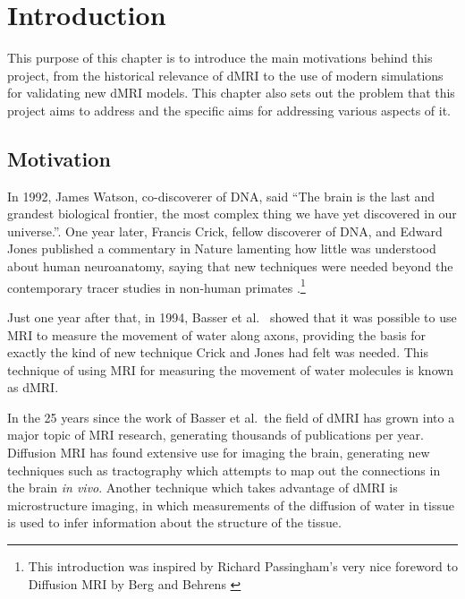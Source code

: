 \chapter{Introduction}
\label{sec:introduction}

\chaptertoc{}

\begin{chapterabstract}
  This purpose of this chapter is to introduce the main motivations behind this project, from the historical relevance of \acl{dMRI} to the use of modern simulations for validating new \acl{dMRI} models.
  This chapter also sets out the problem that this project aims to address and the specific aims for addressing various aspects of it.
\end{chapterabstract}

\section{Motivation}
\label{sec:intro_motivation}
In 1992, James Watson, co-discoverer of DNA, said ``The brain is the last and grandest biological frontier, the most complex thing we have yet discovered in our universe.''\cite{NAP1785}.
One year later, Francis Crick, fellow discoverer of DNA, and Edward Jones published a commentary in Nature lamenting how little was understood about human neuroanatomy, saying that new techniques were needed beyond the contemporary tracer studies in non-human primates \cite{Crick1993}.\footnote{This introduction was inspired by Richard Passingham's very nice foreword to Diffusion MRI by Berg and Behrens \cite{Johansen-Berg2013}}

Just one year after that, in 1994, Basser et al.\ \cite{Basser1994} showed that it was possible to use \ac{MRI} to measure the movement of water along axons, providing the basis for exactly the kind of new technique Crick and Jones had felt was needed.
This technique of using \ac{MRI} for measuring the movement of water molecules is known as \ac{dMRI}.

In the 25 years since the work of Basser et al.\ the field of \acl{dMRI} has grown into a major topic of \ac{MRI} research, generating thousands of publications per year.
Diffusion MRI has found extensive use for imaging the brain, generating new techniques such as tractography which attempts to map out the connections in the brain \emph{in vivo}.
Another technique which takes advantage of \ac{dMRI} is microstructure imaging, in which measurements of the diffusion of water in tissue is used to infer information about the structure of the tissue. 


